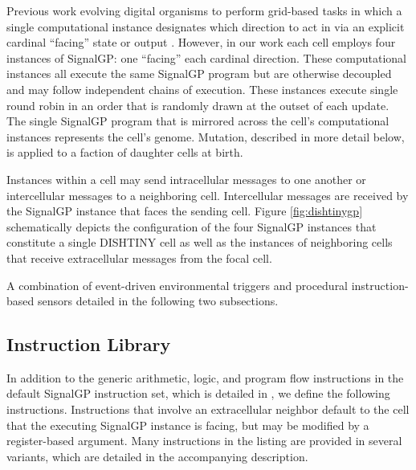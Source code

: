 Previous work evolving digital organisms to perform grid-based tasks in which a single computational instance designates which direction to act in via an explicit cardinal ``facing'' state or output \cite{goldsby2014evolutionary, goldsby2018serendipitous, grabowski2010early, biswas2014causes, lalejini2018evolving}.
However, in our work each cell employs four instances of SignalGP: one ``facing'' each cardinal direction.
These computational instances all execute the same SignalGP program but are otherwise decoupled and may follow independent chains of execution.
These instances execute single round robin in an order that is randomly drawn at the outset of each update.
The single SignalGP program that is mirrored across the cell's computational instances represents the cell's genome.
Mutation, described in more detail below, is applied to a faction of daughter cells at birth.

Instances within a cell may send intracellular messages to one another or intercellular messages to a neighboring cell.
Intercellular messages are received by the SignalGP instance that faces the sending cell.
Figure \ref{fig:dishtinygp} schematically depicts the configuration of the four SignalGP instances that constitute a single DISHTINY cell as well as the instances of neighboring cells that receive extracellular messages from the focal cell.

A combination of event-driven environmental triggers and procedural instruction-based sensors detailed in the following two subsections.

\subsection{Instruction Library}

In addition to the generic arithmetic, logic, and program flow instructions in the default SignalGP instruction set, which is detailed in \cite{lalejini2018evolving}, we define the following instructions.
Instructions that involve an extracellular neighbor default to the cell that the executing SignalGP instance is facing, but may be modified by a register-based argument.
Many instructions in the listing are provided in several variants, which are detailed in the accompanying description.


